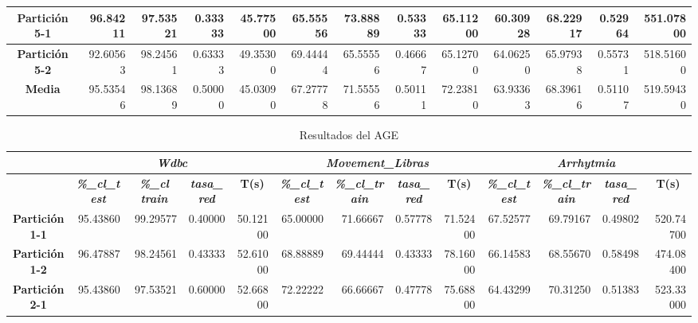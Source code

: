 \documentclass[a4paper,11pt]{article}
\begin{document}
\begin{table}[H]
\begin{adjustbox}{width=1.1\textwidth}
\begin{tabular}{|c|r|r|r|r|r|r|r|r|r|r|r|r|}
    \textbf{Partición 5-1} & 96.84211 & 97.53521 & 0.33333 & 45.77500 & 65.55556 & 73.88889 & 0.53333 & 65.11200 & 60.30928 & 68.22917 & 0.52964 & 551.07800 \\ \hline
    \textbf{Partición 5-2} & 92.60563 & 98.24561 & 0.63333 & 49.35300 & 69.44444 & 65.55556 & 0.46667 & 65.12700 & 64.06250 & 65.97938 & 0.55731 & 518.51600 \\ \hline
    \textbf{Media} & 95.53546 & 98.13689 & 0.50000 & 45.03090 & 67.27778 & 71.55556 & 0.50111 & 72.23810 & 63.93363 & 68.39616 & 0.51107 & 519.59430 \\ \hline
    \end{tabular}
    \end{adjustbox}
    \label{AGG}
  \end{table}
  
   \begin{table}[H]	
    \caption*{Resultados del AGE}
    \begin{adjustbox}{width=1.1\textwidth}
   \begin{tabular}{|c|r|r|r|r|r|r|r|r|r|r|r|r|}
    \hline
    \multicolumn{1}{|l|}{} & \multicolumn{ 4}{c|}{\textbf{\textit{Wdbc}}} & \multicolumn{ 4}{c|}{\textbf{\textit{Movement\_Libras}}} & \multicolumn{ 4}{c|}{\textbf{\textit{Arrhytmia}}} \\ \hline
    \multicolumn{1}{|l|}{} & \multicolumn{1}{c|}{\textbf{\textit{\%\_cl\_test}}} & \multicolumn{1}{c|}{\textbf{\textit{\%\_cl train}}} & \multicolumn{1}{c|}{\textbf{\textit{tasa\_red}}} & \multicolumn{1}{c|}{\textbf{T(s)}} & \multicolumn{1}{c|}{\textbf{\textit{\%\_cl\_test}}} & \multicolumn{1}{c|}{\textbf{\textit{\%\_cl\_train}}} & \multicolumn{1}{c|}{\textbf{\textit{tasa\_red}}} & \multicolumn{1}{c|}{\textbf{T(s)}} & \multicolumn{1}{c|}{\textbf{\textit{\%\_cl\_test}}} & \multicolumn{1}{c|}{\textbf{\textit{\%\_cl\_train}}} & \multicolumn{1}{c|}{\textbf{\textit{tasa\_red}}} & \multicolumn{1}{c|}{\textbf{T(s)}} \\ \hline
    \textbf{Partición 1-1} & 95.43860 & 99.29577 & 0.40000 & 50.12100 & 65.00000 & 71.66667 & 0.57778 & 71.52400 & 67.52577 & 69.79167 & 0.49802 & 520.74700 \\ \hline
    \textbf{Partición 1-2} & 96.47887 & 98.24561 & 0.43333 & 52.61000 & 68.88889 & 69.44444 & 0.43333 & 78.16000 & 66.14583 & 68.55670 & 0.58498 & 474.08400 \\ \hline
    \textbf{Partición 2-1} & 95.43860 & 97.53521 & 0.60000 & 52.66800 & 72.22222 & 66.66667 & 0.47778 & 75.68800 & 64.43299 & 70.31250 & 0.51383 & 523.33000 \\ \hline

\end{tabular}
\end{adjustbox}
\end{table}
\end{document}
